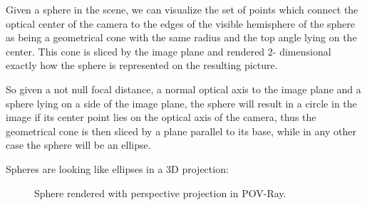 \documentclass[a4paper,twocolumn]{article}
\begin{document}
	Given a sphere in the scene, we can visualize the set of points which connect the optical center of the camera to the edges of the visible hemisphere of the sphere as being a geometrical cone with the same radius and the top angle lying on the center. This cone is sliced by the image plane and rendered 2- dimensional exactly how the sphere is represented on the resulting picture.
	
	So given a not null focal distance, a normal optical axis to the image plane and a sphere lying on a side of the image plane, the sphere will result in a circle in the image if its center point lies on the optical axis of the camera, thus the geometrical cone is then sliced by a plane parallel to its base, while in any other case the sphere will be an ellipse.


	
	Spheres are looking like ellipses in a 3D projection:
	
	\begin{figure}[h!]
		\centering
		\caption{Sphere rendered with perspective projection in POV-Ray.}
	\end{figure}
	
	
\end{document}
